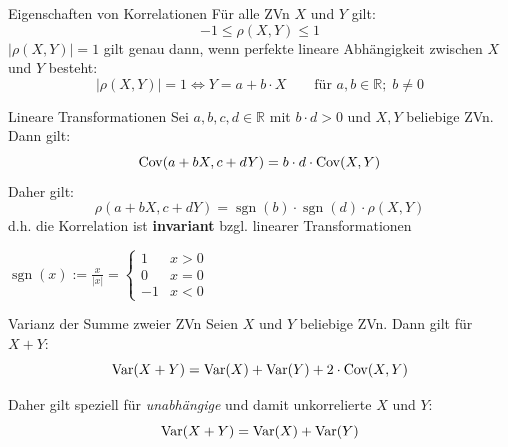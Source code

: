 \documentclass[
  10pt,
  ignorenonframetext,
]{beamer}
\begin{document}
\begin{frame}{Eigenschaften von Korrelationen}
\label{eigenschaften-von-korrelationen}
Für alle ZVn \(X\) und \(Y\) gilt: \[
-1 \leq \rho(X,Y) \leq 1
\] \(|\rho(X,Y)| = 1\) gilt genau dann, wenn perfekte lineare
Abhängigkeit zwischen \(X\) und \(Y\) besteht: \[
|\rho(X,Y)| = 1 \iff Y = a + b \cdot X \qquad \mbox{für } a,b \in \mathbb{R};\; b \neq 0 
\]
\end{frame}

\begin{frame}{Lineare Transformationen}
\label{lineare-transformationen-1}
Sei \(a, b, c, d \in \mathbb{R}\) mit \(b \cdot d > 0\) und \(X, Y\)
beliebige ZVn. Dann gilt: \[
\operatorname{Cov}(a + bX, c + dY) = b \cdot d \cdot \operatorname{Cov}(X,Y)
\] Daher gilt: \[
\rho(a + bX, c + dY)  =  \operatorname{sgn}(b) \cdot \operatorname{sgn}(d) \cdot \rho(X,Y)
\] d.h. die Korrelation ist \textbf{invariant} bzgl. linearer
Transformationen

\vspace{3em}
\scriptsize

\(\operatorname{sgn}(x) := \frac{x}{|x|} = \begin{cases} 1 & x > 0 \\ 0 & x=0 \\ -1 & x<0 \end{cases}\)
\end{frame}

\begin{frame}{Varianz der Summe zweier ZVn}
\label{varianz-der-summe-zweier-zvn}
Seien \(X\) und \(Y\) beliebige ZVn. Dann gilt für \(X + Y\): \[
\operatorname{Var}(X + Y) = \operatorname{Var}(X) + \operatorname{Var}(Y) + 2 \cdot \operatorname{Cov}(X,Y)
\]

Daher gilt speziell für \emph{unabhängige} und damit unkorrelierte \(X\)
und \(Y\): \[
\operatorname{Var}(X + Y) = \operatorname{Var}(X) + \operatorname{Var}(Y)
\]

\end{frame}
\end{document}
